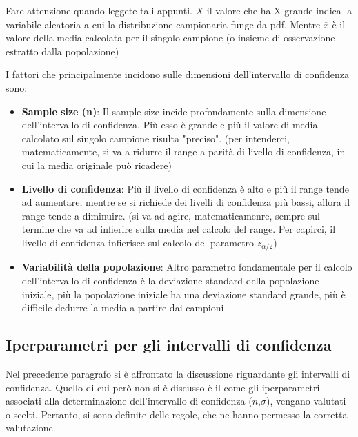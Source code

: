 \begin{warn}
Fare attenzione quando leggete tali appunti. \(\overline{X}\) il valore che ha X grande indica la variabile aleatoria a cui la distribuzione campionaria funge da pdf. Mentre \(\overline{x}\) è il valore della media calcolata per il singolo campione (o insieme di osservazione estratto dalla popolazione)
\end{warn}

I fattori che principalmente incidono sulle dimensioni dell'intervallo di confidenza sono:
\begin{itemize}
    \item \textbf{Sample size (n)}: Il sample size incide profondamente sulla dimensione dell'intervallo di confidenza. Più esso è grande e più il valore di media calcolato sul singolo campione risulta "preciso". (per intenderci, matematicamente, si va a ridurre il range a parità di livello di confidenza, in cui la media originale può ricadere)
    
    \item \textbf{Livello di confidenza}: Più il livello di confidenza è alto e più il range tende ad aumentare, mentre se si richiede dei livelli di confidenza più bassi, allora il range tende a diminuire. (si va ad agire, matematicamenre, sempre sul termine che va ad infierire sulla media nel calcolo del range. Per capirci, il livello di confidenza infierisce sul calcolo del parametro \(z_{\alpha/2}\))
    
    \item \textbf{Variabilità della popolazione}: Altro parametro fondamentale per il calcolo dell'intervallo di confidenza è la deviazione standard della popolazione iniziale, più la popolazione iniziale ha una deviazione standard grande, più è difficile dedurre la media a partire dai campioni

\end{itemize}

\subsection{Iperparametri per gli intervalli di confidenza}\label{par:iperparametri}
Nel precedente paragrafo si è affrontato la discussione riguardante gli intervalli di confidenza. Quello di cui però non si è discusso è il come gli iperparametri associati alla determinazione dell'intervallo di confidenza (\(n\),\(\sigma\)), vengano valutati o scelti. Pertanto, si sono definite delle regole, che ne hanno permesso la corretta valutazione.

